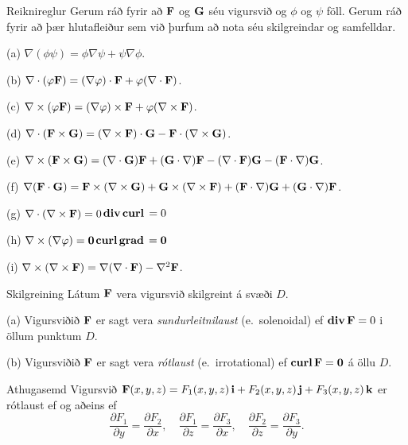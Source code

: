 \begin{frame}{} 

\begin {block}{Reiknireglur \rtask{}}
  Gerum ráð fyrir að $\mbox{${\bf F}$}$ og $\mbox{${\bf G}$}$ séu
vigursvið og $\phi$ og $\psi$ föll.  Gerum ráð fyrir að þær
hlutafleiður sem við þurfum að nota séu skilgreindar og samfelldar. 

(a) $\nabla(\phi\psi)=\phi\nabla\psi+\psi\nabla\phi$.

(b)  $\nabla\cdot(\varphi\mbox{${\bf F}$})=(\nabla\varphi)\cdot\mbox{${\bf F}$}+\varphi(\nabla\cdot\mbox{${\bf F}$})$.

(c) $\nabla\times(\varphi\mbox{${\bf F}$})=(\nabla\varphi)\times\mbox{${\bf F}$}+\varphi(\nabla\times\mbox{${\bf F}$})$. 

(d)  $\nabla\cdot(\mbox{${\bf F}$}\times\mbox{${\bf G}$})=(\nabla\times\mbox{${\bf F}$})\cdot\mbox{${\bf G}$}
-\mbox{${\bf F}$}\cdot(\nabla\times\mbox{${\bf G}$})$.

(e) $\nabla\times(\mbox{${\bf F}$}\times\mbox{${\bf G}$})=(\nabla\cdot\mbox{${\bf G}$})\mbox{${\bf F}$}
+(\mbox{${\bf G}$}\cdot\nabla)\mbox{${\bf F}$}-(\nabla\cdot\mbox{${\bf F}$})\mbox{${\bf G}$}-(\mbox{${\bf F}$}\cdot\nabla)\mbox{${\bf G}$}$.

(f) $\nabla(\mbox{${\bf F}$}\cdot\mbox{${\bf G}$})=\mbox{${\bf F}$}\times(\nabla\times \mbox{${\bf G}$})+\mbox{${\bf G}$}\times(\nabla\times \mbox{${\bf F}$})+(\mbox{${\bf F}$}\cdot\nabla)\mbox{${\bf G}$}+(\mbox{${\bf G}$}\cdot\nabla)\mbox{${\bf F}$}$.

(g) $\nabla\cdot(\nabla\times \mbox{${\bf F}$})=0$\qquad\qquad$\mbox{${\rm\bf div\,}$}\mbox{${\rm\bf curl\,}$}=0$

(h) $\nabla\times(\nabla\varphi)=\mbox{${\bf 0}$}$\qquad\qquad$\mbox{${\rm\bf curl\,}$}\mbox{${\rm\bf grad\,}$}=\mbox{${\bf 0}$}$

(i)  $\nabla\times(\nabla\times \mbox{${\bf F}$})=\nabla(\nabla\cdot\mbox{${\bf F}$})-\nabla^2\mbox{${\bf F}$}$.

\end{block}

\end{frame}




\begin{frame}{} 

\begin {block}{Skilgreining \rtask{}}
 Látum $\mbox{${\bf F}$}$ vera vigursvið skilgreint á svæði $D$.  

(a) Vigursviðið $\mbox{${\bf F}$}$ er sagt vera {\em sundurleitnilaust}
(e.~solenoidal) ef $\mbox{${\rm\bf div\,}$}\mbox{${\bf F}$}=0$ i öllum punktum  $D$.

(b) Vigursviðið $\mbox{${\bf F}$}$ er sagt vera {\em rótlaust} (e.~irrotational) ef $\mbox{${\rm\bf curl\,}$}\mbox{${\bf F}$}=\mbox{${\bf 0}$}$ á öllu $D$.
    
\end{block}

\end{frame}




\begin{frame}{} 

\begin {block}{Athugasemd \rtask{}}
 Vigursvið   $\mbox{${\bf F}$}(x,y,z)=F_1(x,y,z)\,\mbox{${\bf i}$}+F_2(x,y,z)\,\mbox{${\bf j}$}+F_3(x,y,z)\,\mbox{${\bf k}$}$ er rótlaust ef og aðeins ef 
$$\frac{\partial F_1}{\partial y}=
\frac{\partial F_2}{\partial x},\quad
\frac{\partial F_1}{\partial z}=
\frac{\partial F_3}{\partial x},\quad
\frac{\partial F_2}{\partial z}=
\frac{\partial F_3}{\partial y}.$$

\end{block}

\end{frame}




